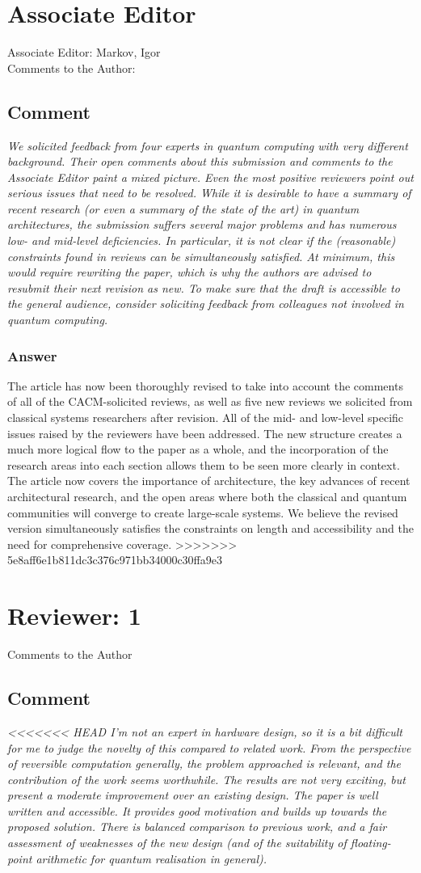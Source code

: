\documentclass{article}
\newcommand{\comment}{\subsection{Comment}\em}
\newcommand{\answer}{\rm \subsubsection*{Answer}}
\begin{document}
\section{Associate Editor}

Associate Editor: Markov, Igor\\
Comments to the Author:\\

\comment
We solicited feedback from four experts in quantum computing with very
different background. Their open comments about this submission and
comments to the Associate Editor paint a mixed picture. Even the most
positive reviewers point out serious issues that need to be
resolved. While it is desirable to have a summary of recent research
(or even a summary of the state of the art) in quantum architectures,
the submission suffers several major problems and has numerous low-
and mid-level deficiencies. In particular, it is not clear if the
(reasonable) constraints found in reviews can be simultaneously
satisfied. At minimum, this would require rewriting the paper, which
is why the authors are advised to resubmit their next revision as
new. To make sure that the draft is accessible to the general
audience, consider soliciting feedback from colleagues not involved in
quantum computing.

\answer

The article has now been thoroughly revised to take into account the
comments of all of the CACM-solicited reviews, as well as five new
reviews we solicited from classical systems researchers after
revision.  All of the mid- and low-level specific issues raised by the
reviewers have been addressed.  The new structure creates a much more
logical flow to the paper as a whole, and the incorporation of the
research areas into each section allows them to be seen more clearly
in context.  The article now covers the importance of architecture,
the key advances of recent architectural research, and the open areas
where both the classical and quantum communities will converge to
create large-scale systems.  We believe the revised version
simultaneously satisfies the constraints on length and accessibility
and the need for comprehensive coverage.
>>>>>>> 5e8aff6e1b811dc3c376c971bb34000c30ffa9e3

\section{Reviewer: 1}

Comments to the Author
\comment
<<<<<<< HEAD
I'm not an expert in hardware design, so it is a bit difficult for me to judge
the novelty of this compared to related work. From the perspective of reversible
computation generally, the problem approached is relevant, and the contribution
of the work seems worthwhile. The results are not very exciting, but present a
moderate improvement over an existing design. The paper is well written and
accessible. It provides good motivation and builds up towards the proposed solution. There is balanced comparison to previous work, and a fair assessment of
weaknesses of the new design (and of the suitability of floating-point arithmetic
for quantum realisation in general).
\end{document}
